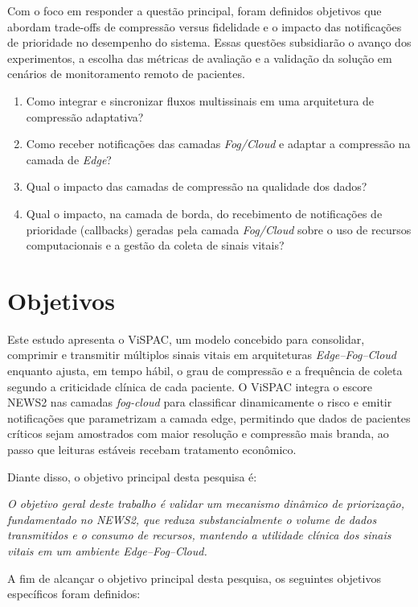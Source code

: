 \documentclass[twoside,english,brazilian]{UNISINOSmonografia}
\begin{document}
Com o foco em responder a questão principal, foram definidos objetivos que abordam trade-offs de compressão versus fidelidade e o impacto das notificações de prioridade no desempenho do sistema. Essas questões subsidiarão o avanço dos experimentos, a escolha das métricas de avaliação e a validação da solução em cenários de monitoramento remoto de pacientes.

\begin{enumerate}
    \item Como integrar e sincronizar fluxos multissinais em uma arquitetura de compressão adaptativa?
    \item Como receber notificações das camadas \textit{Fog/Cloud} e adaptar a compressão na camada de \textit{Edge}?
    \item Qual o impacto das camadas de compressão na qualidade dos dados?
    \item Qual o impacto, na camada de borda, do recebimento de notificações de prioridade (callbacks) geradas pela camada \textit{Fog/Cloud} sobre o uso de recursos computacionais e a gestão da coleta de sinais vitais?
\end{enumerate}

\section{Objetivos}

Este estudo apresenta o ViSPAC, um modelo concebido para consolidar, comprimir e transmitir múltiplos sinais vitais em arquiteturas \textit{Edge–Fog–Cloud} enquanto ajusta, em tempo hábil, o grau de compressão e a frequência de coleta segundo a criticidade clínica de cada paciente. O ViSPAC integra o escore NEWS2 nas camadas \textit{fog‑cloud} para classificar dinamicamente o risco e emitir notificações que parametrizam a camada edge, permitindo que dados de pacientes críticos sejam amostrados com maior resolução e compressão mais branda, ao passo que leituras estáveis recebam tratamento econômico.

Diante disso, o objetivo principal desta pesquisa é:

\textit{O objetivo geral deste trabalho é validar um mecanismo dinâmico de priorização, fundamentado no NEWS2, que reduza substancialmente o volume de dados transmitidos e o consumo de recursos, mantendo a utilidade clínica dos sinais vitais em um ambiente Edge–Fog–Cloud.}

A fim de alcançar o objetivo principal desta pesquisa, os seguintes objetivos específicos foram definidos:
\end{document}
